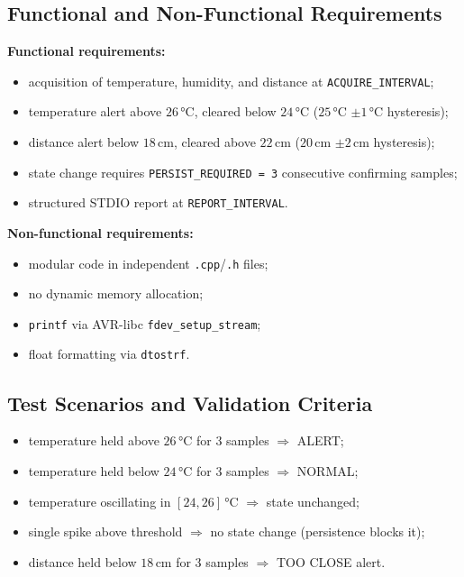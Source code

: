 \documentclass[12pt,a4paper]{article}
\begin{document}
\subsection{Functional and Non-Functional Requirements}

\textbf{Functional requirements:}
\begin{itemize}
    \item acquisition of temperature, humidity, and distance at \texttt{ACQUIRE\_INTERVAL};
    \item temperature alert above $26$\,°C, cleared below $24$\,°C ($25$\,°C $\pm1$\,°C hysteresis);
    \item distance alert below $18$\,cm, cleared above $22$\,cm ($20$\,cm $\pm2$\,cm hysteresis);
    \item state change requires \texttt{PERSIST\_REQUIRED = 3} consecutive confirming samples;
    \item structured STDIO report at \texttt{REPORT\_INTERVAL}.
\end{itemize}

\textbf{Non-functional requirements:}
\begin{itemize}
    \item modular code in independent \texttt{.cpp}/\texttt{.h} files;
    \item no dynamic memory allocation;
    \item \texttt{printf} via AVR-libc \texttt{fdev\_setup\_stream};
    \item float formatting via \texttt{dtostrf}.
\end{itemize}

\subsection{Test Scenarios and Validation Criteria}
\begin{itemize}
    \item temperature held above $26$\,°C for 3 samples $\Rightarrow$ ALERT;
    \item temperature held below $24$\,°C for 3 samples $\Rightarrow$ NORMAL;
    \item temperature oscillating in $[24, 26]$\,°C $\Rightarrow$ state unchanged;
    \item single spike above threshold $\Rightarrow$ no state change (persistence blocks it);
    \item distance held below $18$\,cm for 3 samples $\Rightarrow$ TOO CLOSE alert.
\end{itemize}
\end{document}
